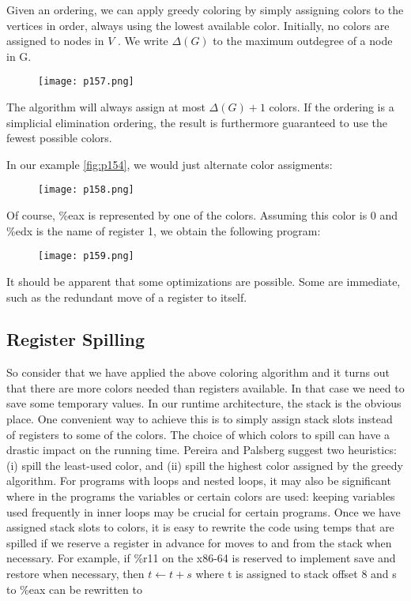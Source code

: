 Given an ordering, we can apply greedy coloring by simply assigning colors to the
vertices in order, always using the lowest available color. Initially,
no colors are assigned to nodes in $V$ . We write $\Delta(G)$ to the maximum
outdegree of a node in G.


\begin{figure}[H]
	\centering
	\texttt{[image: p157.png]}
	\caption{}
	\label{fig:p157}
\end{figure}


The algorithm will always assign at most $\Delta(G)+1$  colors. If the ordering
is a simplicial elimination ordering, the result is furthermore guaranteed to
use the fewest possible colors.

In our example \ref{fig:p154}, we would just alternate color assigments:


\begin{figure}[H]
	\centering
	\texttt{[image: p158.png]}
	\caption{}
	\label{fig:p158}
\end{figure}

Of course, \%eax is represented by one of the colors. Assuming this color is
0 and \%edx is the name of register 1, we obtain the following program:

\begin{figure}[H]
	\centering
	\texttt{[image: p159.png]}
	\caption{}
	\label{fig:p159}
\end{figure}


It should be apparent that some optimizations are possible. Some are
immediate, such as the redundant move of a register to itself.

\subsection{Register Spilling}


So consider that we have applied the above coloring algorithm and it turns
out that there are more colors needed than registers available. In that case
we need to save some temporary values. In our runtime architecture, the
stack is the obvious place. One convenient way to achieve this is to simply
assign stack slots instead of registers to some of the colors. The choice of
which colors to spill can have a drastic impact on the running time. Pereira
and Palsberg suggest two heuristics: (i) spill the least-used color, and (ii)
spill the highest color assigned by the greedy algorithm. For programs with
loops and nested loops, it may also be significant where in the programs the
variables or certain colors are used: keeping variables used frequently in
inner loops may be crucial for certain programs.
Once we have assigned stack slots to colors, it is easy to rewrite the code
using temps that are spilled if we reserve a register in advance for moves
to and from the stack when necessary. For example, if \%r11 on the x86-64
is reserved to implement save and restore when necessary, then \(t \leftarrow t + s \)
where t is assigned to stack offset 8 and s to \%eax can be rewritten to


